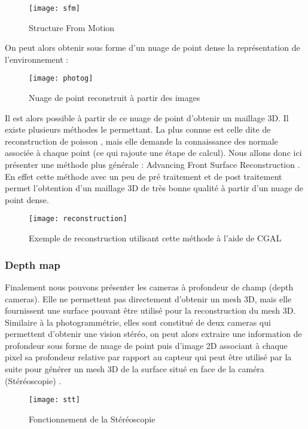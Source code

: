 \begin{figure}[h]
    \centering
    \texttt{[image: sfm]}
    \caption{Structure From Motion}
    \label{fig:sfm}
\end{figure}
\FloatBarrier

On peut alors obtenir sous forme d'un nuage de point dense la représentation de l'environnement :

\begin{figure}[h]
    \centering
    \texttt{[image: photog]}
    \caption{Nuage de point reconstruit à partir des images}
    \label{fig:photog}
\end{figure}
\FloatBarrier


Il est alors possible à partir de ce nuage de point d'obtenir un maillage 3D. Il existe plusieurs méthodes le permettant. La plus connue est celle dite de reconstruction de poisson \cite{poisson}, mais elle demande la connaissance des normale associée à chaque point (ce qui rajoute une étape de calcul). Nous allons donc ici présenter une méthode plus générale : Advancing Front Surface Reconstruction \cite{dddddd}. En effet cette méthode avec un peu de pré traitement et de post traitement permet l'obtention d'un maillage 3D de très bonne qualité à partir d'un nuage de point dense.

\begin{figure}[h]
    \centering
    \texttt{[image: reconstruction]}
    \caption{Exemple de reconstruction utilisant cette méthode à l'aide de CGAL}
    \label{fig:photog}
\end{figure}
\FloatBarrier


\subsubsection{Depth map} 
Finalement nous pouvons présenter les cameras à profondeur de champ (depth cameras). Elle ne permettent pas directement d'obtenir un mesh 3D, mais elle fournissent une surface pouvant être utilisé pour la reconstruction du mesh 3D. Similaire à la photogrammétrie, elles sont constitué de deux cameras qui permettent d'obtenir une vision stéréo, on peut alors extraire une information de profondeur sous forme de nuage de point puis d'image 2D associant à chaque pixel sa profondeur relative par rapport au capteur qui peut être utilisé par la suite pour générer un mesh 3D de la surface situé en face de la caméra (Stéréoscopie) \cite{book1} .

\begin{figure}[h]
    \centering
    \texttt{[image: stt]}
    \caption{Fonctionnement de la Stéréoscopie}
    \label{fig:pifuhdWork2}
\end{figure}
\FloatBarrier

